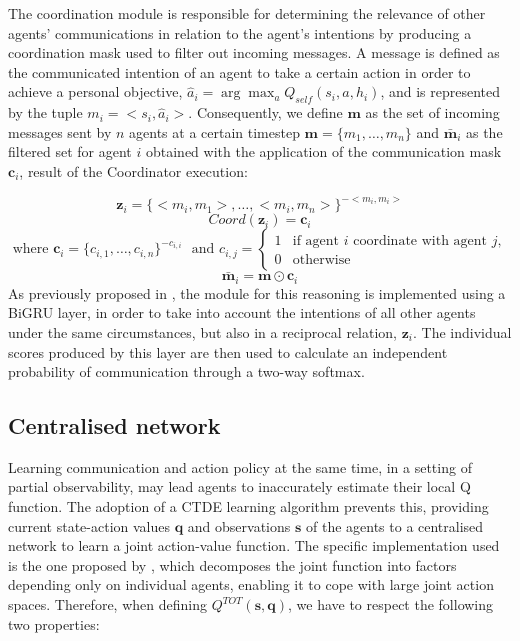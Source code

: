 \documentclass[a4paper,singleside,12pt]{report} %
\begin{document}
The coordination module is responsible for determining the relevance of other agents' communications in relation to the agent's intentions by producing a coordination mask used to filter out incoming messages. A message is defined as the communicated intention of an agent to take a certain action in order to achieve a personal objective, $\hat{a}_i=\arg\max_{a}Q_{self}(s_i,a,h_i)$, and is represented by the tuple \(m_i=<s_i,\hat{a}_i>\). Consequently, we define \(\textbf{m}\) as the set of incoming messages sent by \(n\) agents at a certain timestep \(\textbf{m}=\{m_1,\dots,m_n\}\) and \(\bar{\textbf{m}}_i\) as the filtered set for agent \(i\) obtained with the application of the communication mask \(\textbf{c}_i\), result of the Coordinator execution:

  \begin{equation}
    \textbf{z}_i=\{<m_i,m_1>, \dots ,<m_i,m_n>\}^{-<m_i,m_i>}
  \end{equation}
  \begin{equation}
    Coord(\textbf{z}_i)=\textbf{c}_i
  \end{equation}
  $ \text{ where } \textbf{c}_i=\{c_{i,1},\dots,c_{i,n}\}^{-c_{i,i}}$
  $\text{ and } c_{i,j}= 
    \begin{cases}
        1 & \text{if agent } i \text{ coordinate with agent } j,\\
        0 & \text{otherwise}
    \end{cases}$
  \begin{equation}
    \bar{\textbf{m}}_i=\textbf{m} \odot \textbf{c}_i
  \end{equation}
As previously proposed in \cite{Jiang2018LearningAC}, the module for this reasoning is implemented using a BiGRU layer, in order to take into account the intentions of all other agents under the same circumstances, but also in a reciprocal relation, \(\textbf{z}_i\). The individual scores produced by this layer are then used to calculate an independent probability of communication through a two-way softmax.

\subsection{Centralised network}\label{centralised-network}
Learning communication and action policy at the same time, in a setting of partial observability, may lead agents to inaccurately estimate their local Q function. The adoption of a CTDE learning algorithm prevents this, providing current state-action values $\textbf{q}$ and observations $\textbf{s}$ of the agents to a centralised network to learn a joint action-value function. The specific implementation used is the one proposed by \cite{Rashid2018QMIXMV}, which decomposes the joint function into factors depending only on individual agents, enabling it to cope with large joint action spaces. Therefore, when defining \(Q^{TOT}(\textbf{s}, \textbf{q})\), we have to respect the following two properties:
\end{document}
